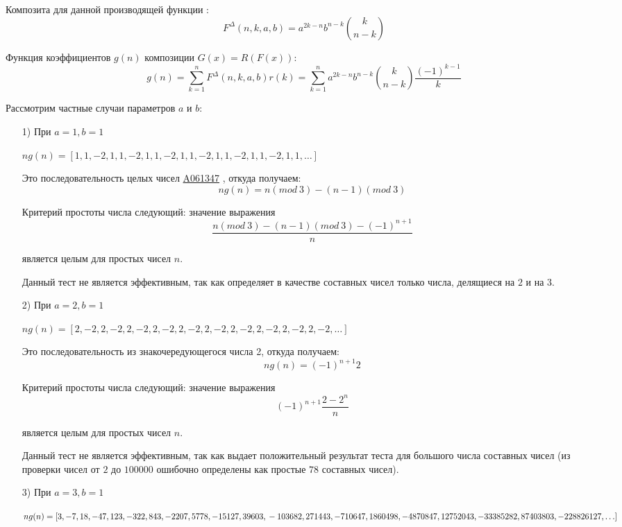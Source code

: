 \documentclass[
russian,
cp1251,
14pt,
simple
]{eskdtext}
\theoremstyle{definition}
\begin{document}
Композита для данной производящей функции \cite{KruchininVV}:
$$
F^\Delta(n,k,a,b)=a^{2k-n}b^{n-k}{k \choose n-k}
$$

Функция коэффициентов $g(n)$ композиции $G(x)=R(F(x))$:
$$
g(n)=\sum^{n}_{k=1}{F^\Delta(n,k,a,b)r(k)}=\sum^{n}_{k=1}{a^{2k-n}b^{n-k}{k \choose n-k}\frac{(-1)^{k-1}}{k}}
$$

Рассмотрим частные случаи параметров $a$ и $b$:
\begin{itemize}
\item[1)] При $a=1, b=1$

\begin{math}
ng(n)=[1,1,-2,1,1,-2,1,1,-2,1,1,-2,1,1,-2,1,1,-2,1,1,\ldots]
\end{math}

Это последовательность целых чисел \href{http://oeis.org/A061347}{A061347} \cite{oeis}, откуда получаем:
$$
ng(n)=n(mod\ 3)-(n-1)(mod\ 3)
$$

Критерий простоты числа следующий: значение выражения
$$
\frac{n(mod\ 3)-(n-1)(mod\ 3)-(-1)^{n+1}}{n}
$$

является целым для простых чисел $n$.

Данный тест не является эффективным, так как определяет в качестве составных чисел только числа, делящиеся на $2$ и на $3$.

\item[2)] При $a=2, b=1$

\begin{math}
ng(n)=[2,-2,2,-2,2,-2,2,-2,2,-2,2,-2,2,-2,2,-2,2,-2,2,-2,\ldots]
\end{math}

Это последовательность из знакочередующегося числа 2, откуда получаем:
$$
ng(n)=(-1)^{n+1}2
$$

Критерий простоты числа следующий: значение выражения
$$
(-1)^{n+1}\frac{2-2^n}{n}
$$

является целым для простых чисел $n$.

Данный тест не является эффективным, так как выдает положительный результат теста для большого числа составных чисел (из проверки чисел от $2$ до $100000$ ошибочно определены как простые $78$ составных чисел).

\item[3)] При $a=3, b=1$

\begin{math}
ng(n)=[3,-7,18,-47,123,-322,843,-2207,5778,-15127,39603,\\
-103682,271443,-710647,1860498,-4870847,12752043,-33385282,\\
87403803,-228826127,\ldots]
\end{math}


\end{itemize}
\end{document}
